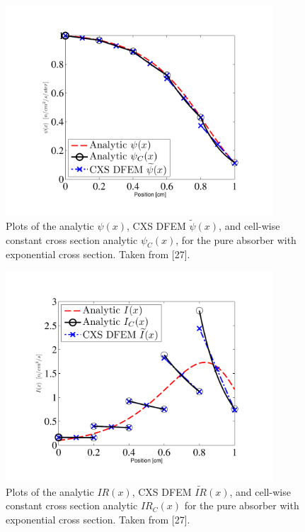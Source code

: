 \begin{figure}[!htp]
\centering
\includegraphics[width=10cm,trim=0.75in  0.25in 0.5in 0.5,clip=true]{chapter3_variable_xs/Psi_Blades.pdf}
\caption{Plots of the analytic $\psi(x)$, CXS DFEM $\widetilde{\psi}(x)$, and cell-wise constant cross section analytic $\psi_C(x)$, for the pure absorber with exponential cross section.  Taken from [27].}
\label{fig:cxs_blades_psi}
\end{figure}
\begin{figure}[!hbp]
\centering
\includegraphics[width=10cm,trim=0.75in  0.25in 0.5in 0.5in,clip=true]{chapter3_variable_xs/I_Blades.pdf}
\caption{Plots of the analytic $IR(x)$, CXS DFEM $\widetilde{IR}(x)$, and  cell-wise constant cross section analytic $IR_C(x)$ for the pure absorber with exponential cross section.  Taken from [27].}
\label{fig:cxs_blades_ir}
\end{figure}


